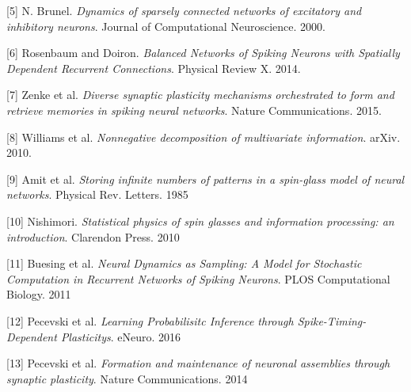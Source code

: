 \documentclass{ucetd}
\begin{document}
[5] N. Brunel. \textit{Dynamics of sparsely connected networks of excitatory and inhibitory neurons}. Journal of Computational Neuroscience. 2000. 

[6] Rosenbaum and Doiron. \textit{Balanced Networks of Spiking Neurons with Spatially Dependent Recurrent Connections}. Physical Review X. 2014.

[7] Zenke et al. \textit{Diverse synaptic plasticity mechanisms
orchestrated to form and retrieve memories
in spiking neural networks}. Nature Communications. 2015.

[8] Williams et al. \textit{Nonnegative decomposition of multivariate information}. arXiv. 2010.

[9] Amit et al. \textit{Storing infinite numbers of patterns in a spin-glass model of neural networks}. Physical Rev. Letters. 1985

[10] Nishimori. \textit{Statistical physics of spin glasses and information processing: an introduction}. Clarendon Press. 2010

[11] Buesing et al. \textit{Neural Dynamics as Sampling: A Model for Stochastic Computation in Recurrent Networks of Spiking Neurons}. PLOS Computational Biology. 2011

[12] Pecevski et al. \textit{Learning Probabilisitc Inference through Spike-Timing-Dependent Plasticitys}. eNeuro. 2016

[13] Pecevski et al. \textit{Formation and maintenance of neuronal assemblies through synaptic plasticity}. Nature Communications. 2014

%
%
\end{document}
